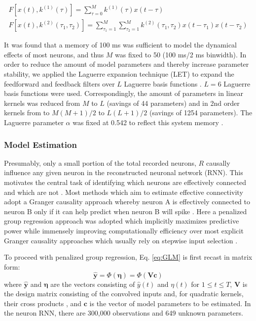 \documentclass[11pt,a4paper,final]{article}
\begin{document}
\begin{subequations}
	\begin{align}
	F[x(t),k^{(1)}(\tau)]=\sum_{\tau=0}^{M}k^{(1)}(\tau)x(t-\tau)\\
	F[x(t),k^{(2)}(\tau_1,\tau_2)]=\sum_{\tau_1=1}^M\sum_{\tau_2=1}^Mk^{(2)}(\tau_1,\tau_2)x(t-\tau_1)x(t-\tau_2)
	\end{align}
	\label{eq:FF}
\end{subequations}

It was found that a memory of 100 ms was sufficient to model the dynamical effects of most neurons, and thus $M$ was fixed to 50 (100 ms/2 ms binwidth).
In order to reduce the amount of model parameters and thereby increase parameter stability, we applied the Laguerre expansion technique (LET) to expand the feedforward and feedback filters over $L$ Laguerre basis functions \citep{marm04}.
$L=6$ Laguerre basis functions were used.
Correspondingly, the amount of parameters in linear kernels was reduced from $M$ to $L$ (savings of 44 parameters) and in 2nd order kernels from to $M(M+1)/2$ to $L(L+1)/2$ (savings of 1254 parameters).
The Laguerre parameter $\alpha$ was fixed at 0.542 to reflect this system memory \citep{marm04}.


\subsubsection{Model Estimation \label{MtE}}
Presumably, only a small portion of the total recorded neurons, $R$ causally influence any given neuron in the reconstructed neuronal network (RNN).
This motivates the central task of identifying which neurons are effectively connected and which are not \citep{sporns09,fallani14}.
Most methods which aim to estimate effective connectivity adopt a Granger causality approach whereby neuron A is effectively connected to neuron B only if it can help predict when neuron B will spike \citep{shoham10,brown11,sandler14,zhou14}.
Here a penalized group regression approach was adopted which implicitly maximizes predictive power while immensely improving computationally efficiency over most explicit Granger causality approaches which usually rely on stepwise input selection \citep{song13sparse,robinson15}.

To proceed with penalized group regression, Eq. \ref{eq:GLM} is first recast in matrix form:
\begin{equation}
\bm{\hat{y}}=\Phi(\bm{\eta})=\Phi(\bm{Vc})
\label{eq:mat}
\end{equation}
where $\bm{\hat{y}}$ and $\bm{\eta}$ are the vectors consisting of $\hat{y}(t)$ and $\eta(t)$ for $1\leq t \leq T$, $\bm{V}$ is the design matrix consisting of the convolved inputs and, for quadratic kernels, their cross products \citep{marm04}, and  $\bm{c}$ is the vector of model parameters to be estimated.
In the \nn{} neuron RNN, there are 300,000 observations and 649 unknown parameters.
\end{document}
